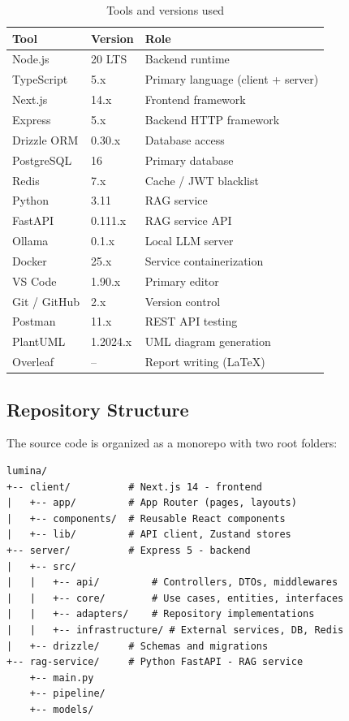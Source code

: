 \begin{table}[H]
\centering
\caption{Tools and versions used}
\begin{tabular}{|l|l|l|}
\hline
\rowcolor{gray!20}
\textbf{Tool} & \textbf{Version} & \textbf{Role} \\
\hline
Node.js & 20 LTS & Backend runtime \\
\hline
TypeScript & 5.x & Primary language (client + server) \\
\hline
Next.js & 14.x & Frontend framework \\
\hline
Express & 5.x & Backend HTTP framework \\
\hline
Drizzle ORM & 0.30.x & Database access \\
\hline
PostgreSQL & 16 & Primary database \\
\hline
Redis & 7.x & Cache / JWT blacklist \\
\hline
Python & 3.11 & RAG service \\
\hline
FastAPI & 0.111.x & RAG service API \\
\hline
Ollama & 0.1.x & Local LLM server \\
\hline
Docker & 25.x & Service containerization \\
\hline
VS Code & 1.90.x & Primary editor \\
\hline
Git / GitHub & 2.x & Version control \\
\hline
Postman & 11.x & REST API testing \\
\hline
PlantUML & 1.2024.x & UML diagram generation \\
\hline
Overleaf & -- & Report writing (LaTeX) \\
\hline
\end{tabular}
\end{table}

\subsection{Repository Structure}

The source code is organized as a monorepo with two root folders:

\begin{verbatim}
lumina/
+-- client/          # Next.js 14 - frontend
|   +-- app/         # App Router (pages, layouts)
|   +-- components/  # Reusable React components
|   +-- lib/         # API client, Zustand stores
+-- server/          # Express 5 - backend
|   +-- src/
|   |   +-- api/         # Controllers, DTOs, middlewares
|   |   +-- core/        # Use cases, entities, interfaces
|   |   +-- adapters/    # Repository implementations
|   |   +-- infrastructure/ # External services, DB, Redis
|   +-- drizzle/     # Schemas and migrations
+-- rag-service/     # Python FastAPI - RAG service
    +-- main.py
    +-- pipeline/
    +-- models/
\end{verbatim}

